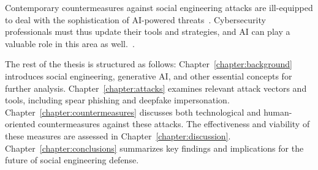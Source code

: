 %
%
Contemporary countermeasures against social engineering attacks are ill-equipped to deal with the sophistication of AI-powered threats~\citep{blauth_AI_Crime_Overview_Malicious_Use_Abuse_2022, king_AI_Crime_Interdisciplinary_Analysis_2019}. Cybersecurity professionals must thus update their tools and strategies, and AI can play a valuable role in this area as well.~\citep{fakhouri_AI_Driven_Solutions_SE_Attacks_2024, tsinganos_Towards_Automated_Recognition_Chat_SE_Enterprise_2018}.





%
%
The rest of the thesis is structured as follows: Chapter~\ref{chapter:background} introduces social engineering, generative AI, and other essential concepts for further analysis. Chapter~\ref{chapter:attacks} examines relevant attack vectors and tools, including spear phishing and deepfake impersonation. Chapter~\ref{chapter:countermeasures} discusses both technological and human-oriented countermeasures against these attacks. The effectiveness and viability of these measures are assessed in Chapter~\ref{chapter:discussion}. Chapter~\ref{chapter:conclusions} summarizes key findings and implications for the future of social engineering defense.






